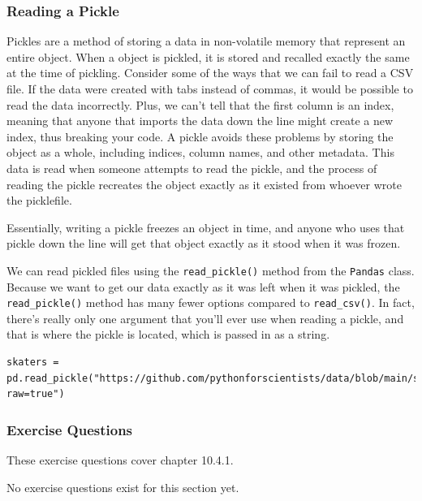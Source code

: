 \subsubsection{Reading a Pickle}
Pickles are a method of storing a data in non-volatile memory that represent an entire  object. When a  object is pickled, it is stored and recalled exactly the same at the time of pickling. Consider some of the ways that we can fail to read a CSV file. If the data were created with tabs instead of commas, it would be possible to read the data incorrectly. Plus, we can't tell  that the first column is an index, meaning that anyone that imports the data down the line might create a new index, thus breaking your code. A pickle avoids these problems by storing the object as a whole, including indices, column names, and other metadata. This data is read when someone attempts to read the pickle, and the process of reading the pickle recreates the object exactly as it existed from whoever wrote the picklefile.\par
Essentially, writing a pickle freezes an object in time, and anyone who uses that pickle down the line will get that object exactly as it stood when it was frozen.\par
We can read pickled files using the \verb|read_pickle()| method from the \verb|Pandas| class. Because we want to get our data exactly as it was left when it was pickled, the \verb|read_pickle()| method has many fewer options compared to \verb|read_csv()|. In fact, there's really only one argument that you'll ever use when reading a pickle, and that is where the pickle is located, which is passed in as a string.\par
\begin{lstlisting}[style=pippython]
skaters = pd.read_pickle("https://github.com/pythonforscientists/data/blob/main/skaters.pkl?raw=true")
\end{lstlisting}
\subsubsection*{Exercise Questions}
These exercise questions cover chapter 10.4.1.

No exercise questions exist for this section yet.
